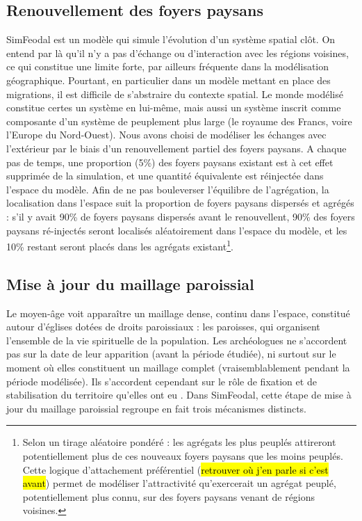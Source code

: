 \subsection{Renouvellement des foyers paysans \label{meca-renouvellement}}

SimFeodal est un modèle qui simule l'évolution d'un système spatial clôt.
On entend par là qu'il n'y a pas d'échange ou d'interaction avec les régions voisines, ce qui constitue une limite forte, par ailleurs fréquente dans la modélisation géographique.
Pourtant, en particulier dans un modèle mettant en place des migrations, il est difficile de s'abstraire du contexte spatial.
Le monde modélisé constitue certes un système en lui-même, mais aussi un système inscrit comme composante d'un système de peuplement plus large (le royaume des Francs, voire l'Europe du Nord-Ouest).
Nous avons choisi de modéliser les échanges avec l'extérieur par le biais d'un renouvellement partiel des foyers paysans.
A chaque pas de temps, une proportion (5\%) des foyers paysans existant est à cet effet supprimée de la simulation, et une quantité équivalente est réinjectée dans l'espace du modèle.
Afin de ne pas bouleverser l'équilibre de l'agrégation, la localisation dans l'espace suit la proportion de foyers paysans dispersés et agrégés :
s'il y avait 90\% de foyers paysans dispersés avant le renouvellent, 90\% des foyers paysans ré-injectés seront localisés aléatoirement dans l'espace du modèle, et les 10\% restant seront placés dans les agrégats existant\footnote{
Selon un tirage aléatoire pondéré : les agrégats les plus peuplés attireront potentiellement plus de ces nouveaux foyers paysans que les moins peuplés.
Cette logique d'attachement préférentiel (\hl{retrouver où j'en parle si c'est avant}) permet de modéliser l'attractivité qu'exercerait un agrégat peuplé, potentiellement plus connu, sur des foyers paysans venant de régions voisines.
}.

\subsection{Mise à jour du maillage paroissial}

Le moyen-âge voit apparaître un maillage dense, continu dans l'espace, constitué autour d'églises dotées de droits paroissiaux : les paroisses, qui organisent l'ensemble de la vie spirituelle de la population.
Les archéologues ne s'accordent pas sur la date de leur apparition (avant la période étudiée), ni surtout sur le moment où elles constituent un maillage complet (vraisemblablement pendant la période modélisée).
Ils s'accordent cependant sur le rôle de fixation et de stabilisation du territoire qu'elles ont eu \autocite{zadora-rio_paroisses_2008}.
Dans SimFeodal, cette étape de mise à jour du maillage paroissial regroupe en fait trois mécanismes distincts.


